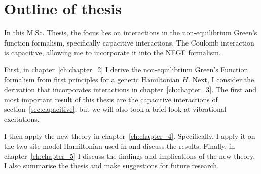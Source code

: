 \section{Outline of thesis}
In this M.Sc. Thesis, the focus lies on interactions in the non-equilibrium Green's function formalism, specifically capacitive interactions. The Coulomb interaction is capacitive, allowing me to incorporate it into the NEGF formalism.

First, in chapter~\ref{ch:chapter_2} I derive the non-equilibrium Green's Function formalism from first principles for a generic Hamiltonian $H$. Next, I consider the derivation that incorporates interactions in chapter~\ref{ch:chapter_3}. The first and most important result of this thesis are the capacitive interactions of section~\ref{sec:capacitive}, but we will also took a brief look at vibrational excitations.

I then apply the new theory  in chapter~\ref{ch:chapter_4}. Specifically, I apply it on the two site model Hamiltonian used in \citet{perrinnano} and discuss the results. Finally, in chapter~\ref{ch:chapter_5} I discuss the findings and implications of the new theory. I also summarise the thesis and make suggestions for future research.

